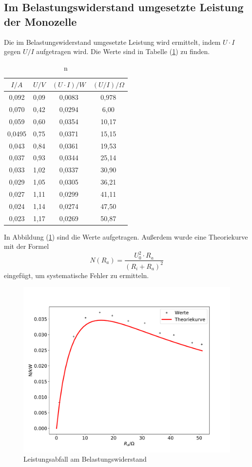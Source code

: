 \subsection{Im Belastungswiderstand umgesetzte Leistung der Monozelle}
Die im Belastungswiderstand umgesetzte Leistung wird ermittelt,
indem $U \cdot I$ gegen $U/I$ aufgetragen wird.
Die Werte sind in Tabelle (\ref{tab:lei}) zu finden.
\begin{table}
  \centering
  \caption{n}
  \label{tab:lei}
  \begin{tabular}{c c c c}
    \toprule $I/A$ & $U/V$ & $(U\cdot I)/W$ & $(U/I)/\Omega$\\
    \midrule
    0,092 & 0,09 & 0,0083 & 0,978\\
    0,070 & 0,42 & 0,0294 & 6,00\\
    0,059 & 0,60 & 0,0354 & 10,17\\
    0,0495 & 0,75 & 0,0371 & 15,15\\
    0,043 & 0,84 & 0,0361 & 19,53\\
    0,037 & 0,93 & 0,0344 & 25,14\\
    0,033 & 1,02 & 0,0337 & 30,90\\
    0,029 & 1,05 & 0,0305 & 36,21\\
    0,027 & 1,11 & 0,0299 & 41,11\\
    0,024 & 1,14 & 0,0274 & 47,50\\
    0,023 & 1,17 & 0,0269 & 50,87\\
    \bottomrule
  \end{tabular}
\end{table}
In Abbildung (\ref{fig:fite}) sind die Werte aufgetragen.
Außerdem wurde eine Theoriekurve mit der Formel
\begin{equation*}
  N(R_a)= \frac{ U_0^2 \cdot R_a}{(R_i + R_a)^2}
\end{equation*}
eingefügt, um systematische Fehler zu ermitteln.
\begin{figure}[H]
  \centering
  \includegraphics[width=\textwidth]{plote.pdf}
  \caption{Leistungsabfall am Belastungswiderstand}
  \label{fig:fite}
\end{figure}
